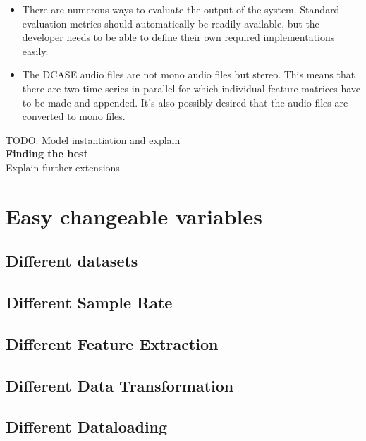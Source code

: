 \begin{itemize}
	\item There are numerous ways to evaluate the output of the system. Standard evaluation metrics should automatically be readily available, but the developer needs to be able to define their own required implementations easily. 
	\item The DCASE audio files are not mono audio files but stereo. This means that there are two time series in parallel for which individual feature matrices have to be made and appended. It's also possibly desired that the audio files are converted to mono files.
\end{itemize}

TODO: Model instantiation and explain \\

{\large \textbf{Finding the best }}\\







Explain further extensions



\section{Easy changeable variables}

\subsection{Different datasets}

\subsection{Different Sample Rate}

\subsection{Different Feature Extraction}

\subsection{Different Data Transformation}

\subsection{Different Dataloading}

